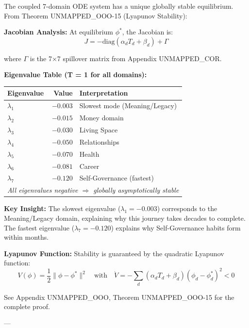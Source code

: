 {{The coupled 7-domain ODE system has a unique globally stable equilibrium. From Theorem UNMAPPED_OOO-15 (Lyapunov Stability):

\textbf{Jacobian Analysis:} At equilibrium $\phi^*$, the Jacobian is:
\begin{equation}
J = -\text{diag}(\alpha_d T_d + \beta_d) + \Gamma
\end{equation}

where $\Gamma$ is the 7×7 spillover matrix from Appendix UNMAPPED_COR.

\textbf{Eigenvalue Table (T = 1 for all domains):}

\begin{center}
\small
\begin{tabular}{@{}lrl@{}}
\toprule
\textbf{Eigenvalue} & \textbf{Value} & \textbf{Interpretation} \\
\midrule
$\lambda_1$ & $-0.003$ & Slowest mode (Meaning/Legacy) \\
$\lambda_2$ & $-0.015$ & Money domain \\
$\lambda_3$ & $-0.030$ & Living Space \\
$\lambda_4$ & $-0.050$ & Relationships \\
$\lambda_5$ & $-0.070$ & Health \\
$\lambda_6$ & $-0.081$ & Career \\
$\lambda_7$ & $-0.120$ & Self-Governance (fastest) \\
\midrule
\multicolumn{3}{l}{\textit{All eigenvalues negative $\Rightarrow$ globally asymptotically stable}} \\
\bottomrule
\end{tabular}
\end{center}

\textbf{Key Insight:} The slowest eigenvalue ($\lambda_1 = -0.003$) corresponds to the Meaning/Legacy domain, explaining why this journey takes decades to complete. The fastest eigenvalue ($\lambda_7 = -0.120$) explains why Self-Governance habits form within months.

\textbf{Lyapunov Function:} Stability is guaranteed by the quadratic Lyapunov function:
\begin{equation}
V(\phi) = \frac{1}{2} \|\phi - \phi^*\|^2 \quad \text{with} \quad \dot{V} = -\sum_d (\alpha_d T_d + \beta_d)(\phi_d - \phi_d^*)^2 < 0
\end{equation}

See Appendix UNMAPPED_OOO, Theorem UNMAPPED_OOO-15 for the complete proof.

---

}}

